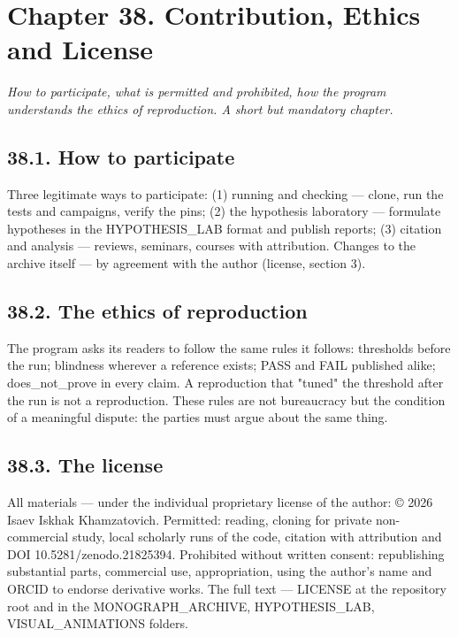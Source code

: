 \documentclass[11pt,a4paper]{article}
\begin{document}
\section{Chapter 38. Contribution, Ethics and License}

\noindent\textit{\color{copper}How to participate, what is permitted and prohibited, how the program understands the ethics of reproduction. A short but mandatory chapter.}

\subsection{38.1. How to participate}

Three legitimate ways to participate: (1) running and checking — clone, run the tests and campaigns, verify the pins; (2) the hypothesis laboratory — formulate hypotheses in the HYPOTHESIS\_LAB format and publish reports; (3) citation and analysis — reviews, seminars, courses with attribution. Changes to the archive itself — by agreement with the author (license, section 3).

\subsection{38.2. The ethics of reproduction}

The program asks its readers to follow the same rules it follows: thresholds before the run; blindness wherever a reference exists; PASS and FAIL published alike; does\_not\_prove in every claim. A reproduction that "tuned" the threshold after the run is not a reproduction. These rules are not bureaucracy but the condition of a meaningful dispute: the parties must argue about the same thing.

\subsection{38.3. The license}

All materials — under the individual proprietary license of the author: © 2026 Isaev Iskhak Khamzatovich. Permitted: reading, cloning for private non-commercial study, local scholarly runs of the code, citation with attribution and DOI 10.5281/zenodo.21825394. Prohibited without written consent: republishing substantial parts, commercial use, appropriation, using the author's name and ORCID to endorse derivative works. The full text — LICENSE at the repository root and in the MONOGRAPH\_ARCHIVE, HYPOTHESIS\_LAB, VISUAL\_ANIMATIONS folders.
\end{document}
